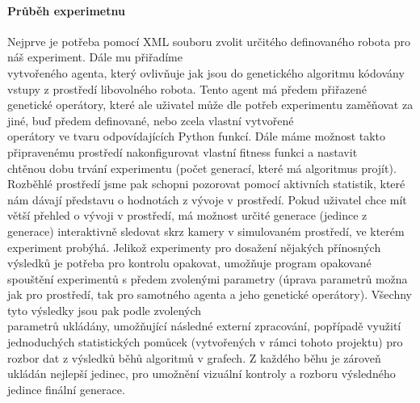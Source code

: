 \documentclass[a4paper, 12pt]{article}
\begin{document}
\paragraph{Průběh experimetnu} Nejprve je potřeba pomocí XML souboru zvolit určitého 
definovaného robota pro náš experiment. Dále mu přiřadíme \\vytvořeného agenta,
který ovlivňuje jak jsou do genetického algoritmu kódovány vstupy z prostředí
libovolného robota. Tento agent má předem přiřazené genetické operátory, které
ale uživatel může dle potřeb experimentu zaměňovat za jiné, buď předem
definované, nebo zcela vlastní vytvořené \\operátory ve tvaru odpovídajících
Python funkcí.
Dále máme možnost takto připravenému prostředí nakonfigurovat vlastní fitness
funkci a nastavit \\chtěnou dobu trvání experimentu (počet generací, které má
algoritmus projít). Rozběhlé prostředí jsme pak schopni pozorovat pomocí
aktivních statistik, které nám dávají představu o hodnotách z vývoje v 
prostředí. Pokud uživatel chce mít větší přehled o vývoji v prostředí, má 
možnost určité generace (jedince z generace) interaktivně sledovat skrz kamery 
v simulovaném prostředí, ve kterém experiment probýhá. 
Jelikož experimenty pro dosažení nějakých přínosných výsledků je potřeba pro
kontrolu opakovat, umožňuje program opakované spouštění experimentů s předem
zvolenými parametry (úprava parametrů možna jak pro prostředí, tak pro
samotného agenta a jeho genetické operátory). Všechny tyto výsledky jsou pak
podle zvolených\\ parametrů ukládány, umožňující následné externí
zpracování, popřípadě využití jednoduchých statistických pomůcek (vytvořených v
rámci tohoto projektu) pro rozbor dat z výsledků běhů algoritmů v grafech.
Z každého běhu je zároveň ukládán nejlepší jedinec, pro umožnění vizuální
kontroly a rozboru výsledného jedince finální generace.



\end{document}
